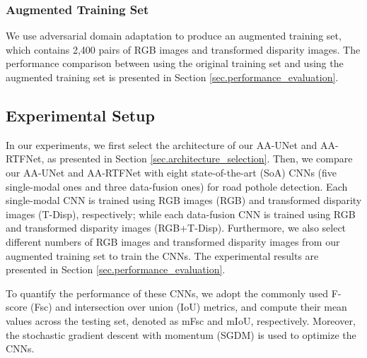\documentclass[runningheads]{llncs}
\begin{document}
\subsubsection{Augmented Training Set}
We use adversarial domain adaptation to produce an augmented training set, which contains 2,400 pairs of RGB images and transformed disparity images. The performance comparison between using the original training set and using the augmented training set is presented in Section \ref{sec.performance_evaluation}.

\subsection{Experimental Setup}
\label{sec.setup}
In our experiments, we first select the architecture of our AA-UNet and AA-RTFNet, as presented in Section \ref{sec.architecture_selection}. Then, we compare our AA-UNet and AA-RTFNet with eight state-of-the-art (SoA) CNNs  (five single-modal ones and three data-fusion ones) for road pothole detection. Each single-modal CNN is trained using RGB images (RGB) and transformed disparity images (T-Disp), respectively; while each data-fusion CNN is trained using RGB and transformed disparity images (RGB+T-Disp). Furthermore, we also select different numbers of RGB images and transformed disparity images from our augmented training set to train the CNNs.  The experimental results are presented in Section \ref{sec.performance_evaluation}.

To quantify the performance of these CNNs, we adopt the commonly used F-score (Fsc) and intersection over union (IoU) metrics, and compute their mean values across the testing set, denoted as mFsc and mIoU, respectively. Moreover, the stochastic gradient descent with momentum (SGDM) \cite{lecun2015deep} is used to optimize the CNNs.
\end{document}
